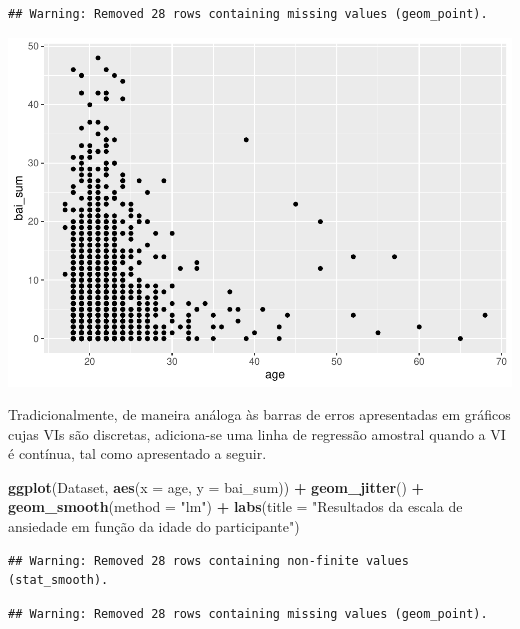 \documentclass[
]{book}
\newenvironment{Shaded}{\begin{snugshade}}{\end{snugshade}}
\newcommand{\DataTypeTok}[1]{\textcolor[rgb]{0.13,0.29,0.53}{#1}}
\newcommand{\KeywordTok}[1]{\textcolor[rgb]{0.13,0.29,0.53}{\textbf{#1}}}
\newcommand{\NormalTok}[1]{#1}
\newcommand{\OperatorTok}[1]{\textcolor[rgb]{0.81,0.36,0.00}{\textbf{#1}}}
\newcommand{\StringTok}[1]{\textcolor[rgb]{0.31,0.60,0.02}{#1}}
\begin{document}
\begin{verbatim}
## Warning: Removed 28 rows containing missing values (geom_point).
\end{verbatim}

\includegraphics{gitbook-demo_files/figure-latex/unnamed-chunk-22-1.pdf}

Tradicionalmente, de maneira análoga às barras de erros apresentadas em gráficos cujas VIs são discretas, adiciona-se uma linha de regressão amostral quando a VI é contínua, tal como apresentado a seguir.

\begin{Shaded}
\begin{Highlighting}[]
\KeywordTok{ggplot}\NormalTok{(Dataset, }\KeywordTok{aes}\NormalTok{(}\DataTypeTok{x =}\NormalTok{ age, }\DataTypeTok{y =}\NormalTok{ bai_sum)) }\OperatorTok{+}
\StringTok{  }\KeywordTok{geom_jitter}\NormalTok{() }\OperatorTok{+}
\StringTok{  }\KeywordTok{geom_smooth}\NormalTok{(}\DataTypeTok{method =} \StringTok{"lm"}\NormalTok{) }\OperatorTok{+}
\StringTok{  }\KeywordTok{labs}\NormalTok{(}\DataTypeTok{title =} \StringTok{"Resultados da escala de ansiedade em função da idade do participante"}\NormalTok{)}
\end{Highlighting}
\end{Shaded}

\begin{verbatim}
## Warning: Removed 28 rows containing non-finite values (stat_smooth).
\end{verbatim}

\begin{verbatim}
## Warning: Removed 28 rows containing missing values (geom_point).
\end{verbatim}
\end{document}
